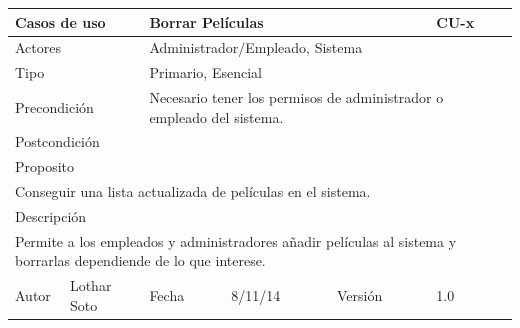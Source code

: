 \documentclass{article}
\begin{document}
\begin{table}[h]
\begin{tabular}{|l|l|l|l|l|l|}
\hline
\multicolumn{2}{|p{2cm}|}{Casos de uso}  & \multicolumn{3}{p{7cm}|}{\textbf{Borrar Películas}} & CU-x \\
\hline
\multicolumn{2}{|p{2cm}|}{Actores}       & \multicolumn{4}{p{8cm}|}{Administrador/Empleado, Sistema}        \\
\hline
\multicolumn{2}{|p{2cm}|}{Tipo}          & \multicolumn{4}{p{8cm}|}{Primario, Esencial}        \\
\hline
\multicolumn{2}{|p{2cm}|}{Precondición}  & \multicolumn{4}{p{8cm}|}{Necesario tener los permisos de administrador o empleado del sistema.}        \\
\hline
\multicolumn{2}{|p{2cm}|}{Postcondición} & \multicolumn{4}{p{8cm}|}{}        \\
\hline
\multicolumn{6}{|p{10cm}|}{Proposito}                                   \\
\hline
\multicolumn{6}{|p{10cm}|}{Conseguir una lista actualizada de películas en el sistema.}                                            \\
\hline
\multicolumn{6}{|p{10cm}|}{Descripción}                                 \\
\hline
\multicolumn{6}{|p{10cm}|}{Permite a los empleados y administradores añadir películas al sistema y borrarlas dependiende de lo que interese.}                                            \\
\hline
Autor          &       Lothar Soto        & Fecha    &  8/11/14   &   Versión  & 1.0\\    
\hline
\end{tabular}
\end{table}
\end{document}
